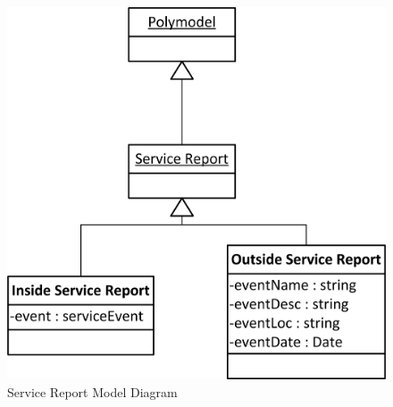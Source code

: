 \documentclass{article}
\begin{document}
\FloatBarrier
\begin{figure}[h!]
\centering
\includegraphics[scale=.65]{img/modelDiagrams/serviceReportModel}
\caption{Service Report Model Diagram}
\label{fig:serviceReportModelDiagram}
\end{figure}
\FloatBarrier
\end{document}
